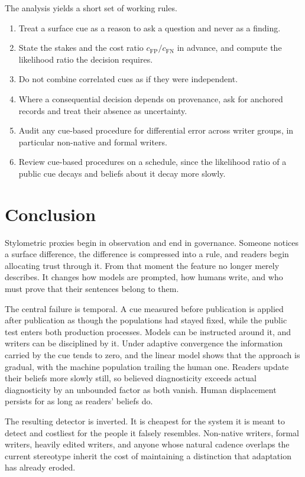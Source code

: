 \documentclass[11pt]{article}
\theoremstyle{plain}
\theoremstyle{definition}
\theoremstyle{remark}
\begin{document}
The analysis yields a short set of working rules.
\begin{enumerate}[label=(\arabic*),leftmargin=2.2em]
\item Treat a surface cue as a reason to ask a question and never as a finding.
\item State the stakes and the cost ratio $c_{\mathrm{FP}}/c_{\mathrm{FN}}$ in advance, and compute the likelihood ratio the decision requires.
\item Do not combine correlated cues as if they were independent.
\item Where a consequential decision depends on provenance, ask for anchored records and treat their absence as uncertainty.
\item Audit any cue-based procedure for differential error across writer groups, in particular non-native and formal writers.
\item Review cue-based procedures on a schedule, since the likelihood ratio of a public cue decays and beliefs about it decay more slowly.
\end{enumerate}

\section{Conclusion}

Stylometric proxies begin in observation and end in governance. Someone notices a surface difference, the difference is compressed into a rule, and readers begin allocating trust through it. From that moment the feature no longer merely describes. It changes how models are prompted, how humans write, and who must prove that their sentences belong to them.

The central failure is temporal. A cue measured before publication is applied after publication as though the populations had stayed fixed, while the public test enters both production processes. Models can be instructed around it, and writers can be disciplined by it. Under adaptive convergence the information carried by the cue tends to zero, and the linear model shows that the approach is gradual, with the machine population trailing the human one. Readers update their beliefs more slowly still, so believed diagnosticity exceeds actual diagnosticity by an unbounded factor as both vanish. Human displacement persists for as long as readers' beliefs do.

The resulting detector is inverted. It is cheapest for the system it is meant to detect and costliest for the people it falsely resembles. Non-native writers, formal writers, heavily edited writers, and anyone whose natural cadence overlaps the current stereotype inherit the cost of maintaining a distinction that adaptation has already eroded.
\end{document}
